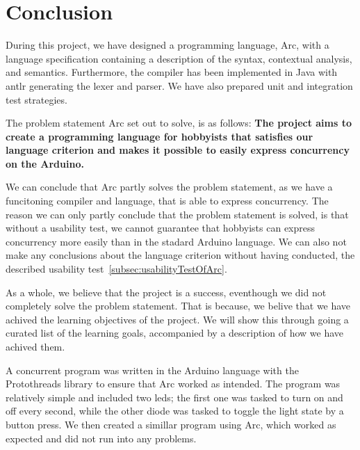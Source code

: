\chapter{Conclusion}\label{cha:conclusion}

During this project, we have designed a programming language, Arc, with a language specification containing a description of the syntax, contextual analysis, and semantics. Furthermore, the compiler has been implemented in Java with \gls{antlr} generating the lexer and parser. We have also prepared unit and integration test strategies.

The problem statement Arc set out to solve, is as follows: 
\textbf{The project aims to create a programming language for hobbyists that satisfies our language criterion and makes it possible to easily express concurrency on the Arduino.}

We can conclude that Arc partly solves the problem statement, as we have a funcitoning compiler and language, that is able to express concurrency. The reason we can only partly conclude that the problem statement is solved, is that without a usability test, we cannot guarantee that hobbyists can express concurrency more easily than in the stadard Arduino language. We can also not make any conclusions about the language criterion without having conducted, the described usability test~\ref{subsec:usabilityTestOfArc}.

As a whole, we believe that the project is a success, eventhough we did not completely solve the problem statement. That is because, we belive that we have achived the learning objectives of the project. We will show this through going a curated list of the learning goals, accompanied by a description of how we have achived them.




A concurrent program was written in the Arduino language with the Protothreads library to ensure that Arc worked as intended. The program was relatively simple and included two \gls{led}s; the first one was tasked to turn on and off every second, while the other diode was tasked to toggle the light state by a button press. We then created a simillar program using Arc, which worked as expected and did not run into any problems.


